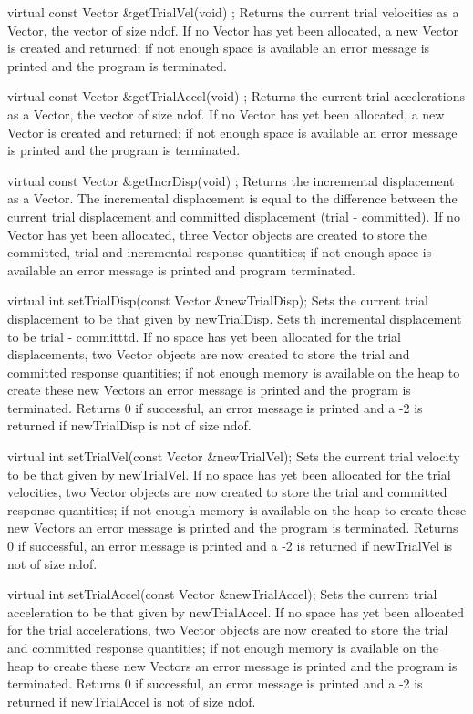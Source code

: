   virtual const Vector &getTrialVel(void) ;  
Returns the current trial velocities as a Vector, the vector of size  ndof.
If no Vector has yet been allocated, a new Vector is created and returned;
if not enough space is available an error message is printed and the
program is terminated.  

  virtual const Vector &getTrialAccel(void) ;  
Returns the current trial accelerations as a Vector, the vector of size  ndof.
If no Vector has yet been allocated, a new Vector is created and returned;
if not enough space is available an error message is printed and the
program is terminated.  


  virtual const Vector &getIncrDisp(void) ;  
Returns the incremental displacement as a Vector. The incremental displacement is 
equal to the difference between the current trial displacement and committed
displacement (trial - committed).
If no Vector has yet been allocated, three Vector 
objects are created to store the committed, trial and incremental response
quantities; if not enough space is available an error message
is printed and program terminated.  


 virtual int setTrialDisp(const Vector &newTrialDisp); 
Sets the current trial displacement to be that given by
 newTrialDisp. Sets th incremental displacement to be trial - committtd.
If no space has yet been allocated for
the trial displacements, two Vector objects are now created to store
the trial and committed response quantities; if not enough memory 
is available on the heap to create these new Vectors an error message
is printed and the program is terminated. Returns 0 if successful,
an error message is printed and a -2 is returned if 
newTrialDisp is not of size  ndof. 


 virtual int setTrialVel(const Vector &newTrialVel); 
Sets the current trial velocity to be that given by
 newTrialVel. If no space has yet been allocated for
the trial velocities, two Vector objects are now created to store
the trial and committed response quantities; if not enough memory 
is available on the heap to create these new Vectors an error message
is printed and the program is terminated. Returns 0 if successful,
an error message is printed and a -2 is returned if 
newTrialVel is not of size  ndof. 

 virtual int setTrialAccel(const Vector &newTrialAccel); 
Sets the current trial acceleration to be that given by
 newTrialAccel. If no space has yet been allocated for
the trial accelerations, two Vector objects are now created to store
the trial and committed response quantities; if not enough memory 
is available on the heap to create these new Vectors an error message
is printed and the program is terminated. Returns 0 if successful,
an error message is printed and a -2 is returned if 
newTrialAccel is not of size  ndof. 

